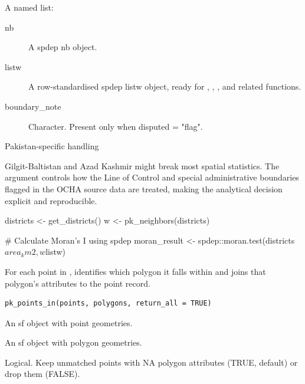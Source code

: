 \documentclass[a4paper]{book}
\begin{document}
%
\begin{Value}
A named list:
\begin{description}

\item[nb] A spdep nb object.
\item[listw] A row-standardised spdep listw object, ready for
, ,
, and related functions.
\item[boundary\_note] Character. Present only when disputed = "flag".

\end{description}

\end{Value}
%
\begin{Section}{Pakistan-specific handling}

Gilgit-Baltistan and Azad Kashmir might break most spatial statistics. The  argument
controls how the Line of Control and special administrative boundaries
flagged in the OCHA source data are treated, making the analytical
decision explicit and reproducible.
\end{Section}
%
\begin{Examples}
\begin{ExampleCode}

  districts <- get_districts()
  w <- pk_neighbors(districts)

  # Calculate Moran's I using spdep
  moran_result <- spdep::moran.test(districts$area_km2, w$listw)

\end{ExampleCode}
\end{Examples}
%
\begin{Description}
For each point in , identifies which polygon it falls
within and joins that polygon's attributes to the point record.
\end{Description}
%
\begin{Usage}
\begin{verbatim}
pk_points_in(points, polygons, return_all = TRUE)
\end{verbatim}
\end{Usage}
%
\begin{Arguments}
\begin{ldescription}
\item[\code{points}] An sf object with point geometries.

\item[\code{polygons}] An sf object with polygon geometries.

\item[\code{return\_all}] Logical. Keep unmatched points with NA polygon
attributes (TRUE, default) or drop them (FALSE).
\end{ldescription}
\end{Arguments}
\end{document}

